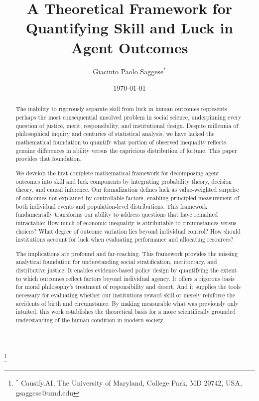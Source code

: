 


  \title{A Theoretical Framework for Quantifying Skill and Luck in Agent
  Outcomes}

  \author{Giacinto Paolo Saggese$^{*}$}
  \thanks{$^{*}$ Causify.AI, The University of Maryland, College Park, MD 20742, USA, gsaggese@umd.edu}

  \date{\today}

  \maketitle

  \begin{abstract}
    The inability to rigorously separate skill from luck in human outcomes represents
    perhaps the most consequential unsolved problem in social science, underpinning
    every question of justice, merit, responsibility, and institutional design.
    Despite millennia of philosophical inquiry and centuries of statistical analysis,
    we have lacked the mathematical foundation to quantify what portion of observed
    inequality reflects genuine differences in ability versus the capricious distribution
    of fortune. This paper provides that foundation.

    We develop the first complete mathematical framework for decomposing agent outcomes
    into skill and luck components by integrating probability theory, decision theory,
    and causal inference. Our formalization defines luck as value-weighted surprise
    of outcomes not explained by controllable factors, enabling principled measurement
    of both individual events and population-level distributions. This framework
    fundamentally transforms our ability to address questions that have remained
    intractable: How much of economic inequality is attributable to circumstances
    versus choices? What degree of outcome variation lies beyond individual control?
    How should institutions account for luck when evaluating performance and allocating
    resources?

    The implications are profound and far-reaching. This framework provides the missing
    analytical foundation for understanding social stratification, meritocracy, and
    distributive justice. It enables evidence-based policy design by quantifying
    the extent to which outcomes reflect factors beyond individual agency. It offers
    a rigorous basis for moral philosophy's treatment of responsibility and desert.
    And it supplies the tools necessary for evaluating whether our institutions
    reward skill or merely reinforce the accidents of birth and circumstance.
    By making measurable what was previously only intuited, this work establishes
    the theoretical basis for a more scientifically grounded understanding of the
    human condition in modern society.
  \end{abstract}

